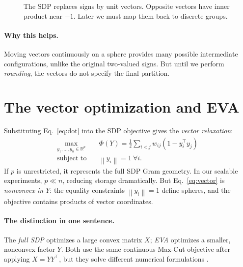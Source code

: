 \documentclass[10pt,letterpaper]{article}
\newcommand{\R}{\mathbb{R}}
\newcommand{\norm}[1]{\left\lVert#1\right\rVert}
\begin{document}
\begin{figure}[t]
\centering
{}
\caption{The SDP replaces signs by unit vectors. Opposite vectors have inner product near $-1$. Later we must map them back to discrete groups.}
\end{figure}

\paragraph{Why this helps.} Moving vectors continuously on a sphere provides many possible intermediate configurations, unlike the original two-valued signs. But until we perform \emph{rounding}, the vectors do not specify the final partition.

\section{The vector optimization and EVA}
\label{sec:eva}
Substituting Eq.~\eqref{eq:dot} into the SDP objective gives the \emph{vector relaxation}:
\begin{equation}\label{eq:vector}
 \boxed{\begin{aligned}
 \max_{y_1,\ldots,y_n\in\R^p}\quad&
 \Phi(Y)=\frac12\sum_{i<j}w_{ij}
 (1-y_i^\top y_j)\\
 \text{subject to}\quad&\norm{y_i}=1\ \forall i.
 \end{aligned}}
\end{equation}
If $p$ is unrestricted, it represents the full SDP Gram geometry. In our scalable experiments, $p\ll n$, reducing storage dramatically. But Eq.~\eqref{eq:vector} is \emph{nonconvex in $Y$}: the equality constraints $\norm{y_i}=1$ define spheres, and the objective contains products of vector coordinates.

\paragraph{The distinction in one sentence.} The \emph{full SDP} optimizes a large convex matrix $X$; \emph{EVA} optimizes a smaller, nonconvex factor $Y$. Both use the same continuous Max-Cut objective after applying $X=YY^\top$, but they solve different numerical formulations \cite{eva2026}.
\end{document}
